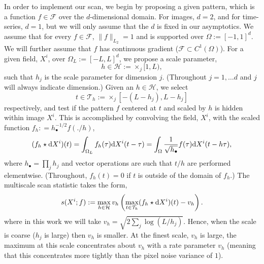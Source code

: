 In order to implement our scan, we begin by proposing a given pattern, which is a function $f \in \mathcal F$ over the $d$-dimensional domain.
For images, $d=2$, and for time-series, $d=1$, but we will only assume that the $d$ is fixed in our asymptotics.
We assume that for every $f \in \mathcal F$, $\| f \|_{L_2} = 1$ and is supported over $\Omega := [-1,1]^d$.
We will further assume that $f$ has continuous gradient ($\mathcal F \subset C^1(\Omega)$).
For a given field, $X^i$, over $\Omega_L := [-L,L]^d$, we propose a scale parameter, 
$$
h \in \mathcal H := \times_j [1, L),
$$
such that $h_j$ is the scale parameter for dimension $j$.
(Throughout $j=1,\ldots d$ and $j$ will always indicate dimension.)
Given an $h \in \mathcal H$, we select 
$$
t \in \mathcal T_h:= \times_j [- (L - h_j), L-h_j]
$$ 
respectively, and test if the pattern $f$ centered at $t$ and scaled by $h$ is hidden within image $X^i$.
This is accomplished by convolving the field, $X^i$, with the scaled function $f_h: = h_\bullet^{-1/2} f(. / h)$,
$$
(f_h \star {\rm d} X^i)(t) = \int_{\Omega_L} f_h(\tau) {\rm d} X^i(t - \tau) = \int_{\Omega} \frac{1}{\sqrt{h_\bullet}}f(\tau) {\rm d} X^i(t - h \tau),
$$
where $h_\bullet = \prod_j h_j$ and vector operations are such that $t/h$ are performed elementwise.
(Throughout, $f_h(t) = 0$ if $t$ is outside of the domain of $f_h$.)
The multiscale scan statistic takes the form,
\begin{equation}
\label{eq:MSS}
s(X^i; f) := \max_{h \in \mathcal H} v_h \left( \max_{t \in \mathcal T_h} (f_h \star {\rm d} X^i)(t) - v_h \right).
\end{equation}
where in this work we will take $v_h = \sqrt{2 \sum_j \log (L/h_j)}$.
Hence, when the scale is coarse ($h_j$ is large) then $v_h$ is smaller.
At the finest scale, $v_h$ is large, the maximum at this scale concentrates about $v_h$ with a rate parameter $v_h$ (meaning that this concentrates more tightly than the pixel noise variance of $1$).

